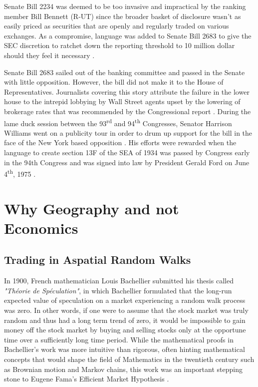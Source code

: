Senate Bill 2234 was deemed to be too invasive and impractical by the ranking member Bill Bennett (R-UT) since the broader basket of disclosure wasn't as easily priced as securities that are openly and regularly traded on various exchanges.  As a compromise, language was added to Senate Bill 2683 to give the SEC discretion to ratchet down the reporting threshold to 10 million dollar should they feel it necessary \citep{Hearing71}. 
	
Senate Bill 2683 sailed out of the banking committee and passed in the Senate with little opposition.  However, the bill did not make it to the House of Representatives.  Journalists covering this story attribute the failure in the lower house to the intrepid lobbying by Wall Street agents upset by the lowering of brokerage rates that was recommended by the Congressional report \citep{Zimmerman1971}.  During the lame duck session between the 93\textsuperscript{rd} and  94\textsuperscript{th} Congresses, Senator Harrison Williams went on a publicity tour in order to drum up support for the bill in the face of the New York based opposition \citep{Dallos74,Dallos74a}.  His efforts were rewarded when the language to create section 13F of the SEA of 1934 was passed by Congress early in the 94{th} Congress and was signed into law by President Gerald Ford on June 4\textsuperscript{th}, 1975 \citep{libraryofcongress}. 
	
\section{Why Geography and not Economics}
	
\subsection{Trading in Aspatial Random Walks}
	
\nocite{Bachelier1900} 
In 1900, French mathematician Louis Bachellier submitted his thesis called \textit{"Th\'{e}orie de Sp\'{e}culation"}, in which Bachellier formulated that the long-run expected value of speculation on a market experiencing a random walk process was zero. In other words, if one were to assume that the stock market was truly random and thus had a long term trend of zero, it would be impossible to gain money off the stock market by buying and selling stocks only at the opportune time over a sufficiently long time period. While the mathematical proofs in Bachellier's work was more intuitive than rigorous, often hinting mathematical concepts that would shape the field of Mathematics in the twentieth century such as Brownian motion and Markov chains, this work was an important stepping stone to Eugene Fama's Efficient Market Hypothesis \citep{Courtault2000}. 
	
